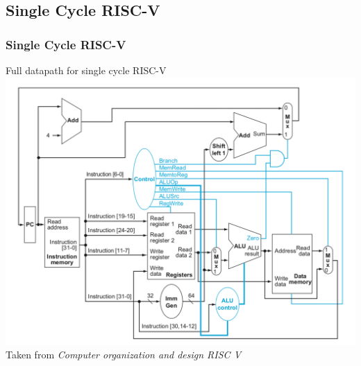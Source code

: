 \documentclass{beamer}
\begin{document}
    \begin{frame}
        \subsection{Single Cycle RISC-V}
        \frametitle{Single Cycle RISC-V}
        \centering
        \vspace{-0.5cm}
        Full datapath for single cycle RISC-V
        \includegraphics[scale=0.35]{"Pictures and plots/FullDatapath"} \\
        \scriptsize{Taken from \textit{Computer organization and design RISC V}}
        
    \end{frame}
    
\end{document}
